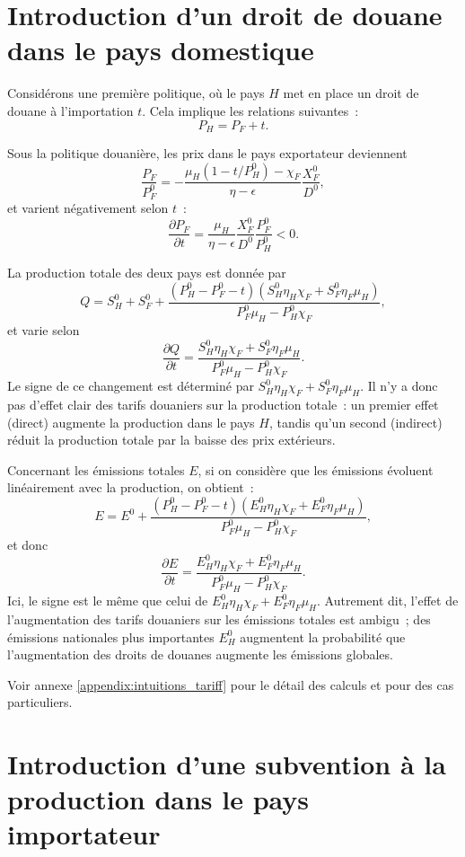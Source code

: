 \section{Introduction d’un droit de douane dans le pays domestique}\label{Sec_tariff}

Considérons une première politique, où le pays $H$ met en place un droit de douane à l’importation $t$. Cela implique les relations suivantes~:
$$
P_H = P_F + t.
$$

Sous la politique douanière, les prix dans le pays exportateur deviennent
$$
\frac{P_F}{P_F^0} = -\frac{\mu_H (1 - t/P_H^0) - \chi_F}{\eta - \epsilon}\frac{X_F^0}{D^0},
$$
et varient négativement selon $t$~:
$$
\frac{\partial P_F}{\partial t} = \frac{\mu_H}{\eta - \epsilon} \frac{X_F^0}{D^0} \frac{P_F^0}{P_H^0} < 0.
$$

La production totale des deux pays est donnée par
$$
Q = S_H^0 + S_F^0 + \frac{(P_H^0 - P_F^0 - t)(S_H^0 \eta_H \chi_F + S_F^0 \eta_F \mu_H)}{P_F^0 \mu_H - P_H^0 \chi_F},
$$
et varie selon
$$
\frac{\partial Q}{\partial t} = \frac{S_H^0 \eta_H \chi_F + S_F^0 \eta_F \mu_H}{P_F^0 \mu_H - P_H^0 \chi_F}.
$$
Le signe de ce changement est déterminé par $S_H^0 \eta_H \chi_F + S_F^0 \eta_F \mu_H$. Il n’y a donc pas d’effet clair des tarifs douaniers sur la production totale~: un premier effet (direct) augmente la production dans le pays $H$, tandis qu’un second (indirect) réduit la production totale par la baisse des prix extérieurs.

Concernant les émissions totales $E$, si on considère que les émissions évoluent linéairement avec la production, on obtient~:
$$
E = E^0 + \frac{(P_H^0 - P_F^0 - t)(E_H^0 \eta_H \chi_F + E_F^0 \eta_F \mu_H)}{P_F^0 \mu_H - P_H^0 \chi_F},
$$
et donc
$$
\frac{\partial E}{\partial t} = \frac{E_H^0 \eta_H \chi_F + E_F^0 \eta_F \mu_H}{P_F^0 \mu_H - P_H^0 \chi_F}.
$$
Ici, le signe est le même que celui de $E_H^0 \eta_H \chi_F + E_F^0 \eta_F \mu_H$. Autrement dit, l’effet de l’augmentation des tarifs douaniers sur les émissions totales est ambigu~; des émissions nationales plus importantes $E_H^0$ augmentent la probabilité que l’augmentation des droits de douanes augmente les émissions globales.

Voir annexe \ref{appendix:intuitions_tariff} pour le détail des calculs et pour des cas particuliers.

\section{Introduction d’une subvention à la production dans le pays importateur}\label{Sec_subvention}

